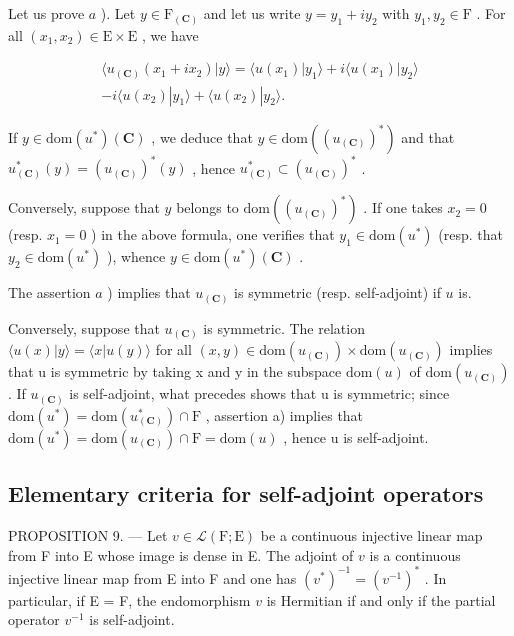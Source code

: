Let us prove \(a\) ). Let \(y \in \mathrm{F}_{(\mathbf{C})}\) and let us write \(y = y_1 + iy_2\) with \(y_1, y_2 \in \mathrm{F}\) . For all \((x_1, x_2) \in \mathrm{E} \times \mathrm{E}\) , we have

\[
\begin{array}{c} \langle u _ {(\mathbf {C})} (x _ {1} + i x _ {2})   |   y \rangle = \langle u (x _ {1})   |   y _ {1} \rangle + i \langle u (x _ {1})   |   y _ {2} \rangle \\ - i \langle u (x _ {2})   |   y _ {1} \rangle + \langle u (x _ {2})   |   y _ {2} \rangle . \end{array}
\]

If \(y \in \text{dom}(u^*)(\mathbf{C})\) , we deduce that \(y \in \text{dom}((u_{(\mathbf{C})})^*)\) and that \(u_{(\mathbf{C})}^*(y) = (u_{(\mathbf{C})})^*(y)\) , hence \(u_{(\mathbf{C})}^* \subset (u_{(\mathbf{C})})^*\) .

Conversely, suppose that \(y\) belongs to \(\text{dom}((u_{(\mathbf{C})})^*)\) . If one takes \(x_2 = 0\) (resp. \(x_1 = 0\) ) in the above formula, one verifies that \(y_1 \in \text{dom}(u^*)\) (resp. that \(y_2 \in \text{dom}(u^*)\) ), whence \(y \in \text{dom}(u^*)(\mathbf{C})\) .

The assertion \(a\) ) implies that \(u_{(\mathbf{C})}\) is symmetric (resp. self-adjoint) if \(u\) is.

Conversely, suppose that \(u_{(\mathbf{C})}\) is symmetric. The relation \(\langle u(x)|y\rangle = \langle x|u(y)\rangle\) for all \((x,y) \in \mathrm{dom}(u_{(\mathbf{C})}) \times \mathrm{dom}(u_{(\mathbf{C})})\) implies that u is symmetric by taking x and y in the subspace \(\mathrm{dom}(u)\) of \(\mathrm{dom}(u_{(\mathbf{C})})\) . If \(u_{(\mathbf{C})}\) is self-adjoint, what precedes shows that u is symmetric; since \(\mathrm{dom}(u^{*}) = \mathrm{dom}(u_{(\mathbf{C})}^{*}) \cap \mathrm{F}\) , assertion a) implies that \(\mathrm{dom}(u^{*}) = \mathrm{dom}(u_{(\mathbf{C})}) \cap \mathrm{F} = \mathrm{dom}(u)\) , hence u is self-adjoint.

\subsection{Elementary criteria for self-adjoint operators}

PROPOSITION 9. --- Let \(v \in \mathcal{L}(\mathrm{F};\mathrm{E})\) be a continuous injective linear map from F into E whose image is dense in E. The adjoint of \(v\) is a continuous injective linear map from E into F and one has \((v^{*})^{-1} = (v^{-1})^{*}\) . In particular, if E = F, the endomorphism \(v\) is Hermitian if and only if the partial operator \(v^{-1}\) is self-adjoint.

